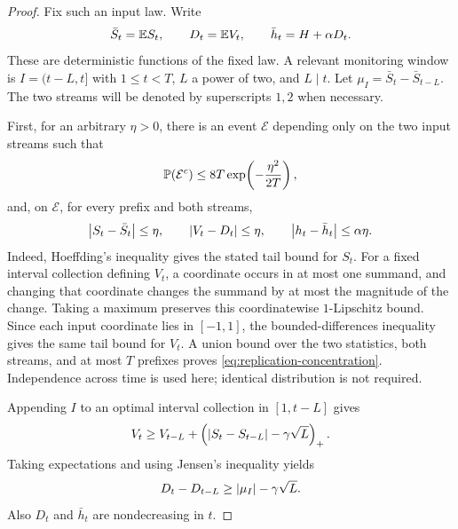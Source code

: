 \begin{proof}
Fix such an input law. Write
\[
 \bar S_t=\mathbb E S_t,\qquad D_t=\mathbb E V_t,\qquad
 \bar h_t=H+\alpha D_t.
\]
These are deterministic functions of the fixed law. A relevant monitoring
window is $I=(t-L,t]$ with $1\le t<T$, $L$ a power of two, and $L\mid t$.
Let $\mu_I=\bar S_t-\bar S_{t-L}$. The two streams will be denoted by
superscripts $1,2$ when necessary.

First, for an arbitrary $\eta>0$, there is an event $\mathcal E$ depending
only on the two input streams such that
\begin{equation}
 \mathbb P(\mathcal E^c)\le 8T\exp\!\left(-\frac{\eta^2}{2T}\right),
 \label{eq:replication-concentration}
\end{equation}
and, on $\mathcal E$, for every prefix and both streams,
\begin{equation}
 \left|S_t-\bar S_t\right|\le\eta,\qquad
 \left|V_t-D_t\right|\le\eta,\qquad
 \left|h_t-\bar h_t\right|\le\alpha\eta.
 \label{eq:replication-good-event}
\end{equation}
Indeed, Hoeffding's inequality gives the stated tail bound for $S_t$.
For a fixed interval collection defining $V_t$, a coordinate occurs in at
most one summand, and changing that coordinate changes the summand by at
most the magnitude of the change. Taking a maximum preserves this
coordinatewise $1$-Lipschitz bound. Since each input coordinate lies in
$[-1,1]$, the bounded-differences inequality gives the same tail bound for
$V_t$. A union bound over the two statistics, both streams, and at most
$T$ prefixes proves \eqref{eq:replication-concentration}. Independence
across time is used here; identical distribution is not required.

Appending $I$ to an optimal interval collection in $[1,t-L]$ gives
\[
 V_t\ge V_{t-L}
       +\left(\left|S_t-S_{t-L}\right|-\gamma\sqrt L\right)_+.
\]
Taking expectations and using Jensen's inequality yields
\begin{equation}
 D_t-D_{t-L}\ge \left|\mu_I\right|-\gamma\sqrt L.
 \label{eq:replication-mean-progress}
\end{equation}
Also $D_t$ and $\bar h_t$ are nondecreasing in $t$.


\end{proof}
